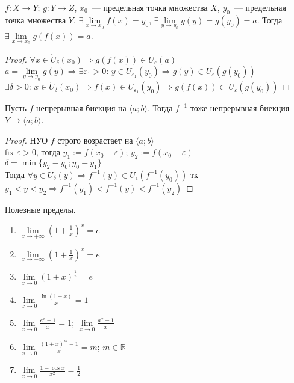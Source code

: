 \documentclass{article}
\begin{document}
	\begin{theorem}
		$f: X \rightarrow Y$; $g: Y \rightarrow Z$, $x_0$~--- предельная точка множества $X$, $y_0$~--- предельная точка множества $Y$. $\exists \lim \limits_{x \rightarrow x_0} f(x) = y_0$, $\exists \lim \limits_{y \rightarrow y_0} g(y) = g(y_0) = a$. Тогда $\exists \lim \limits_{x \rightarrow x_0} g(f(x)) = a$.
	\end{theorem}
	\begin{proof}
		$\forall x \in \mathring{U}_{\delta}(x_0) \Rightarrow g(f(x)) \in U_{\varepsilon} (a)$ \\
		$a = \lim \limits_{y \rightarrow y_0} g(y) \Rightarrow \exists \varepsilon_1 > 0$: $y \in U_{\varepsilon_1} (y_0) \Rightarrow g(y) \in U_{\varepsilon} (g(y_0))$ \\
		$\exists \delta > 0$: $x \in \mathring{U}_{\delta} (x_0) \Rightarrow f(x) \in U_{\varepsilon_1} (y_0) \Rightarrow g(f(x)) \subset U_{\varepsilon} (g(y_0))$
	\end{proof}
	\begin{theorem}
		Пусть $f$ непрерывная биекция на $\langle a; b \rangle$. Тогда $f^{-1}$ тоже непрерывная биекция $Y \rightarrow \langle a; b \rangle$.
	\end{theorem}
	\begin{proof}
		НУО $f$ строго возрастает на $\langle a; b \rangle$ \\
		fix $\varepsilon > 0$, тогда $y_1 := f(x_0 - \varepsilon)$; $y_2 := f(x_0 + \varepsilon)$ \\
		$\delta = \min \{ y_2 - y_0; y_0 - y_1 \}$ \\
		Тогда $\forall y \in U_{\delta} (y) \Rightarrow f^{-1} (y) \in U_{\epsilon} (f^{-1} (y_0))$ тк $y_1 < y < y_2 \Rightarrow f^{-1} (y_1) < f^{-1} (y) < f^{-1} (y_2)$
	\end{proof}
	\begin{statement}
		Полезные пределы.
		\begin{enumerate}
			\item $\lim\limits_{x \rightarrow +\infty} (1 + \frac{1}{x})^x = e$
			\item $\lim\limits_{x \rightarrow -\infty} (1 + \frac{1}{x})^x = e$
			\item $\lim\limits_{x \rightarrow 0} (1 + x)^{\frac{1}{x}} = e$
			\item $\lim\limits_{x \rightarrow 0} \frac{\ln (1 + x)}{x} = 1$
			\item $\lim\limits_{x \rightarrow 0} \frac{e^x - 1}{x} = 1$; $\lim\limits_{x \rightarrow 0} \frac{a^x - 1}{x}$
			\item $\lim\limits_{x \rightarrow 0} \frac{(1 + x)^m - 1}{x} = m$; $m \in \mathbb{R}$
			\item $\lim\limits_{x \rightarrow 0} \frac{1 - \cos x}{x^2} = \frac{1}{2}$
		\end{enumerate}
	\end{statement}
\end{document}
